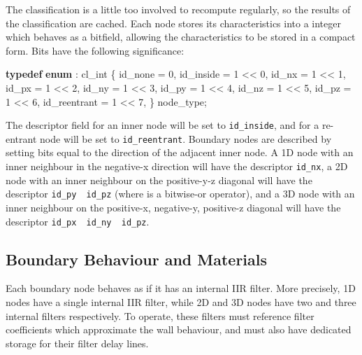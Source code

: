 \documentclass[]{scrreprt}
\newenvironment{Shaded}{}{}
\newcommand{\KeywordTok}[1]{\textcolor[rgb]{0.00,0.44,0.13}{\textbf{{#1}}}}
\newcommand{\DecValTok}[1]{\textcolor[rgb]{0.25,0.63,0.44}{{#1}}}
\newcommand{\NormalTok}[1]{{#1}}
\begin{document}
The classification is a little too involved to recompute regularly, so
the results of the classification are cached. Each node stores its
characteristics into a integer which behaves as a bitfield, allowing the
characteristics to be stored in a compact form. Bits have the following
significance:

\begin{Shaded}
\begin{Highlighting}[]
\KeywordTok{typedef} \KeywordTok{enum} \NormalTok{: cl_int \{}
    \NormalTok{id_none = }\DecValTok{0}\NormalTok{,}
    \NormalTok{id_inside = }\DecValTok{1} \NormalTok{<< }\DecValTok{0}\NormalTok{,}
    \NormalTok{id_nx = }\DecValTok{1} \NormalTok{<< }\DecValTok{1}\NormalTok{,}
    \NormalTok{id_px = }\DecValTok{1} \NormalTok{<< }\DecValTok{2}\NormalTok{,}
    \NormalTok{id_ny = }\DecValTok{1} \NormalTok{<< }\DecValTok{3}\NormalTok{,}
    \NormalTok{id_py = }\DecValTok{1} \NormalTok{<< }\DecValTok{4}\NormalTok{,}
    \NormalTok{id_nz = }\DecValTok{1} \NormalTok{<< }\DecValTok{5}\NormalTok{,}
    \NormalTok{id_pz = }\DecValTok{1} \NormalTok{<< }\DecValTok{6}\NormalTok{,}
    \NormalTok{id_reentrant = }\DecValTok{1} \NormalTok{<< }\DecValTok{7}\NormalTok{,}
\NormalTok{\} node_type;}
\end{Highlighting}
\end{Shaded}

The descriptor field for an inner node will be set to
\texttt{id\_inside}, and for a re-entrant node will be set to
\texttt{id\_reentrant}. Boundary nodes are described by setting bits
equal to the direction of the adjacent inner node. A 1D node with an
inner neighbour in the negative-x direction will have the descriptor
\texttt{id\_nx}, a 2D node with an inner neighbour on the positive-y-z
diagonal will have the descriptor \texttt{id\_py\ \textbar{}\ id\_pz}
(where \texttt{\textbar{}} is a bitwise-or operator), and a 3D node with
an inner neighbour on the positive-x, negative-y, positive-z diagonal
will have the descriptor
\texttt{id\_px\ \textbar{}\ id\_ny\ \textbar{}\ id\_pz}.

\subsection{Boundary Behaviour and
Materials}\label{boundary-behaviour-and-materials}

Each boundary node behaves as if it has an internal IIR filter. More
precisely, 1D nodes have a single internal IIR filter, while 2D and 3D
nodes have two and three internal filters respectively. To operate,
these filters must reference filter coefficients which approximate the
wall behaviour, and must also have dedicated storage for their filter
delay lines.
\end{document}

